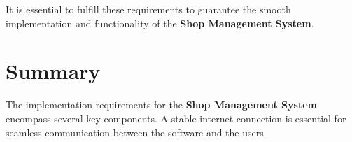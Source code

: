 It is essential to fulfill these requirements to guarantee the smooth implementation and functionality of the \textbf{Shop Management System}.

\section{Summary}
The implementation requirements for the \textbf{Shop Management System} encompass several key components. A stable internet connection is essential for seamless communication between the software and the users. 